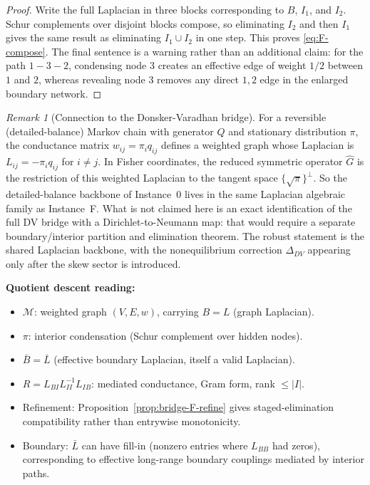 \documentclass[11pt,a4paper]{article}
\numberwithin{equation}{section}
\theoremstyle{thmcompact}
\theoremstyle{remark}
\newtheorem*{remarkplain}{Remark}
\newenvironment{remark}[1][]%
{\begin{remarkbox}\begin{remarkplain}[#1]\normalfont}
		{\end{remarkplain}\end{remarkbox}}
\begin{document}
\begin{proof}
Write the full Laplacian in three blocks corresponding to $B$, $I_1$, and $I_2$. Schur complements over disjoint blocks compose, so eliminating $I_2$ and then $I_1$ gives the same result as eliminating $I_1 \cup I_2$ in one step. This proves \eqref{eq:F-compose}. The final sentence is a warning rather than an additional claim: for the path $1-3-2$, condensing node $3$ creates an effective edge of weight $1/2$ between $1$ and $2$, whereas revealing node $3$ removes any direct $1,2$ edge in the enlarged boundary network.
\end{proof}

\begin{remark}[Connection to the Donsker-Varadhan bridge]\label{rem:F-connection}
For a reversible (detailed-balance) Markov chain with generator $Q$ and stationary distribution $\pi$, the conductance matrix $w_{ij} = \pi_i q_{ij}$ defines a weighted graph whose Laplacian is $L_{ij} = -\pi_i q_{ij}$ for $i \neq j$. In Fisher coordinates, the reduced symmetric operator $\widehat{G}$ is the restriction of this weighted Laplacian to the tangent space $\{\sqrt{\pi}\}^\perp$. So the detailed-balance backbone of Instance~0 lives in the same Laplacian algebraic family as Instance~F. What is not claimed here is an exact identification of the full DV bridge with a Dirichlet-to-Neumann map: that would require a separate boundary/interior partition and elimination theorem. The robust statement is the shared Laplacian backbone, with the nonequilibrium correction $\Delta_{DV}$ appearing only after the skew sector is introduced.
\end{remark}

\textbf{Quotient descent reading:}
\begin{itemize}[leftmargin=2em]
\item $\mathcal{M}$: weighted graph $(V, E, w)$, carrying $B = L$ (graph Laplacian).
\item $\pi$: interior condensation (Schur complement over hidden nodes).
\item $\bar{B} = \bar{L}$ (effective boundary Laplacian, itself a valid Laplacian).
\item $R = L_{BI}L_{II}^{-1}L_{IB}$: mediated conductance, Gram form, rank $\leq |I|$.
\item Refinement: Proposition~\ref{prop:bridge-F-refine} gives staged-elimination compatibility rather than entrywise monotonicity.
\item Boundary: $\bar{L}$ can have fill-in (nonzero entries where $L_{BB}$ had zeros), corresponding to effective long-range boundary couplings mediated by interior paths.
\end{itemize}
\end{document}
